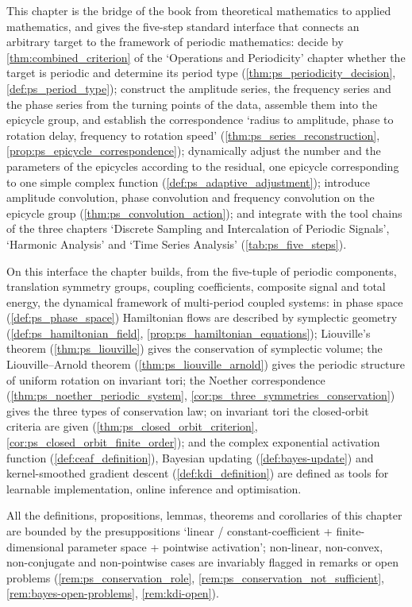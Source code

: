 \begin{remark}\label{rem:periodic-system-summary}
This chapter is the bridge of the book from theoretical mathematics to applied mathematics, and gives the five-step standard interface that connects an arbitrary target to the framework of periodic mathematics: decide by \cref{thm:combined_criterion} of the `Operations and Periodicity' chapter whether the target is periodic and determine its period type (\cref{thm:ps_periodicity_decision}, \cref{def:ps_period_type}); construct the amplitude series, the frequency series and the phase series from the turning points of the data, assemble them into the epicycle group, and establish the correspondence `radius to amplitude, phase to rotation delay, frequency to rotation speed' (\cref{thm:ps_series_reconstruction}, \cref{prop:ps_epicycle_correspondence}); dynamically adjust the number and the parameters of the epicycles according to the residual, one epicycle corresponding to one simple complex function (\cref{def:ps_adaptive_adjustment}); introduce amplitude convolution, phase convolution and frequency convolution on the epicycle group (\cref{thm:ps_convolution_action}); and integrate with the tool chains of the three chapters `Discrete Sampling and Intercalation of Periodic Signals', `Harmonic Analysis' and `Time Series Analysis' (\cref{tab:ps_five_steps}).

On this interface the chapter builds, from the five-tuple of periodic components, translation symmetry groups, coupling coefficients, composite signal and total energy, the dynamical framework of multi-period coupled systems: in phase space (\cref{def:ps_phase_space}) Hamiltonian flows are described by symplectic geometry (\cref{def:ps_hamiltonian_field}, \cref{prop:ps_hamiltonian_equations}); Liouville's theorem (\cref{thm:ps_liouville}) gives the conservation of symplectic volume; the Liouville--Arnold theorem (\cref{thm:ps_liouville_arnold}) gives the periodic structure of uniform rotation on invariant tori; the Noether correspondence (\cref{thm:ps_noether_periodic_system}, \cref{cor:ps_three_symmetries_conservation}) gives the three types of conservation law; on invariant tori the closed-orbit criteria are given (\cref{thm:ps_closed_orbit_criterion}, \cref{cor:ps_closed_orbit_finite_order}); and the complex exponential activation function (\cref{def:ceaf_definition}), Bayesian updating (\cref{def:bayes-update}) and kernel-smoothed gradient descent (\cref{def:kdi_definition}) are defined as tools for learnable implementation, online inference and optimisation.

All the definitions, propositions, lemmas, theorems and corollaries of this chapter are bounded by the presuppositions `linear / constant-coefficient + finite-dimensional parameter space + pointwise activation'; non-linear, non-convex, non-conjugate and non-pointwise cases are invariably flagged in remarks or open problems (\cref{rem:ps_conservation_role}, \cref{rem:ps_conservation_not_sufficient}, \cref{rem:bayes-open-problems}, \cref{rem:kdi-open}).
\end{remark}

